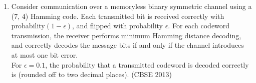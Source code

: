 \begin{enumerate}[label=\thechapter.\arabic*,ref=\thechapter.\theenumi]
\item Consider communication over a memoryless binary symmetric channel using a
(7, 4) Hamming code. Each transmitted bit is received correctly with probability$(1 - \epsilon)$, and flipped with probability $\epsilon$. For each codeword transmission, the receiver
performs minimum Hamming distance decoding, and correctly decodes the message
bits if and only if the channel introduces at most one bit error.
\\For $\epsilon = 0.1$, the probability that a transmitted codeword is decoded correctly is
 \textunderscore\textunderscore\textunderscore\textunderscore\textunderscore\textunderscore (rounded off to two decimal places).
\hfill (CBSE 2013)
\\

\end{enumerate}
